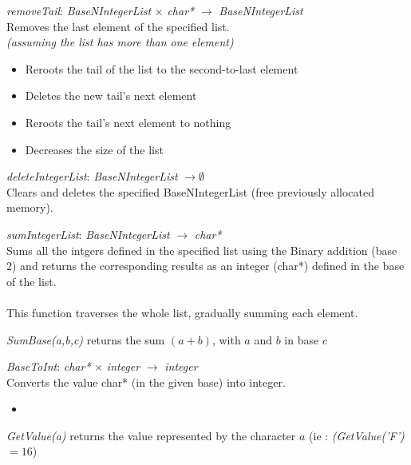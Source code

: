 \documentclass[book, backcover, english, nodocumentinfo]{upmethodology-document}
\begin{document}
		\begin{minipage}{\linewidth}
			\textit{removeTail}: \textit{BaseNIntegerList} $\times$ \textit{char*} $\rightarrow$ \textit{BaseNIntegerList}\\
			Removes the last element of the specified list.\\
			\ov \textit{ (assuming the list has more than one element)}
			\begin{itemize}
				\item Reroots the tail of the list to the second-to-last element
				\item Deletes the new tail's next element
				\item Reroots the tail's next element to nothing
				\item Decreases the size of the list
			\end{itemize}
			\label{algo:BNIL-RemoveTail}
			
		\end{minipage}
		\nxtalgo{}

		\begin{minipage}{\linewidth}
			\textit{deleteIntegerList}: \textit{BaseNIntegerList} $\rightarrow \emptyset$\\
			Clears and deletes the specified BaseNIntegerList (free previously allocated memory).\\
			\label{algo:BNIL-DeleteIntegerList}
			
		\end{minipage}
		\nxtalgo{}

		\begin{minipage}{\linewidth}
			\textit{sumIntegerList}: \textit{BaseNIntegerList} $\rightarrow$ \textit{char*}\\
			Sums all the intgers defined in the specified list using the Binary addition (base 2) and returns the corresponding results as an integer (char*) defined in the base of the list.\\
			\ov\\
			This function traverses the whole list, gradually summing each element.
			\label{algo:BNIL-SumIntegerList}
			
			\textit{SumBase(a,b,c)} returns the sum $(a+b)$, with $a$ and $b$ in base $c$
		\end{minipage}
		\nxtalgo{}

		\begin{minipage}{\linewidth}
			\textit{BaseToInt}: \textit{char*} $\times$ \textit{integer} $\rightarrow$ \textit{integer}\\
			Converts the value char* (in the given base) into integer.
			\ov\\
			\begin{itemize}
				\item
			\end{itemize}
			\label{algo:BNIL-BaseToInt}
			
			\textit{GetValue(a)} returns the value represented by the character $a$
			(ie : \textit{(GetValue('F')} $= 16$)
		\end{minipage}
		\nxtalgo{}
\end{document}
